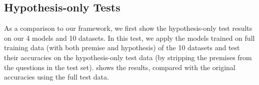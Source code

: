 %
%
%
%

\subsection{Hypothesis-only Tests}
As a comparison to our framework, we first show the hypothesis-only test results
on our 4 models and 10 datasets. In this test, we apply the models trained on
full training data (with both premise and hypothesis) of the 10 datasets and
test their accuracies on the hypothesis-only test data (by stripping
the premises from the questions in the test set). 
shows the results, compared with the original accuracies using the full
test data. 

